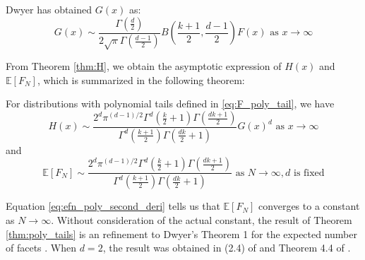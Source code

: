 \documentclass{aptpub}
\def\E{\mathbb{E}}
\begin{document}
Dwyer\cite{dwyer1991convex} has obtained $G(x)$ as:
\begin{equation}\label{eq:g_poly_tail}
     G(x) \sim \frac{\Gamma(\frac{d}{2})}{2\sqrt{\pi} \Gamma(\frac{d-1}{2})}
     B\left(\frac{k+1}{2}, \frac{d-1}{2}\right) F(x)  \textrm{ as } x\to \infty
\end{equation}

From Theorem \ref{thm:H}, we obtain the asymptotic
expression of $H(x)$ and $\E[F_N]$, which is
summarized in the following theorem:
\begin{theorem}\label{thm:poly_tails}
     For distributions with polynomial tails defined in \eqref{eq:F_poly_tail},
     we have
\begin{equation}\label{eq:H_poly_tail_exp}
     H(x) \sim \frac{2^d \pi^{(d-1)/2}\Gamma^d(\frac{k}{2}+1)
     \Gamma(\frac{dk+1}{2})}{
         \Gamma^d(\frac{k+1}{2}) \Gamma(\frac{dk}{2}+1)} G(x)^d 
         \textrm{ as } x\to \infty
\end{equation}
and 
\begin{equation}\label{eq:efn_poly_second_deri}
    \E[F_N] \sim \frac{2^d \pi^{(d-1)/2}\Gamma^d(\frac{k}{2}+1)
    \Gamma(\frac{dk+1}{2})}{
        \Gamma^d(\frac{k+1}{2}) \Gamma(\frac{dk}{2}+1)}
        \textrm{ as } N \to \infty, d \textrm { is fixed}
\end{equation}
\end{theorem}
Equation \eqref{eq:efn_poly_second_deri} tells
us that $\E[F_N]$ converges to a constant as $N \to \infty$.
Without consideration of the actual constant, the result of
Theorem \ref{thm:poly_tails} is an refinement to Dwyer's Theorem 1 for the expected number of facets \cite{dwyer1991convex}.
When $d=2$, the result was obtained in (2.4) of \cite{carnal1970konvexe}
and Theorem 4.4 of \cite{davis1987convex}.
\end{document}
